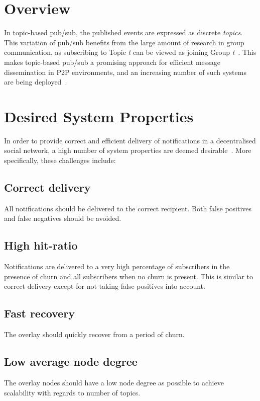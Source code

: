 \section{Overview}

In topic-based pub/sub, the published events are expressed as discrete
\emph{topics}. This variation of pub/sub benefits from the large amount
of research in group communication, as subscribing to Topic \emph{t} can
be viewed as joining Group \emph{t}~\cite{Eugster:2003}. This makes
topic-based pub/sub a promising approach for efficient message
dissemination in P2P environments, and an increasing number of such
systems are being deployed~\cite{Triantafillou:2009}.

\section{Desired System Properties}
In order to provide correct and efficient delivery of notifications in a
decentralised social network, a high number of system properties are
deemed desirable~\cite{Setty:2012}. More specifically, these challenges
include:

\subsection{Correct delivery}
All notifications should be delivered to the
correct recipient. Both false positives and false negatives should be
avoided.

\subsection{High hit-ratio}
Notifications are delivered to a very high
percentage of subscribers in the presence of churn and all subscribers
when no churn is present. This is similar to correct delivery except for
not taking false positives into account.

\subsection{Fast recovery}
The overlay should quickly recover from a
period of churn.

\subsection{Low average node degree}
The overlay nodes should have a low
node degree as possible to achieve scalability with regards to number of
topics.


